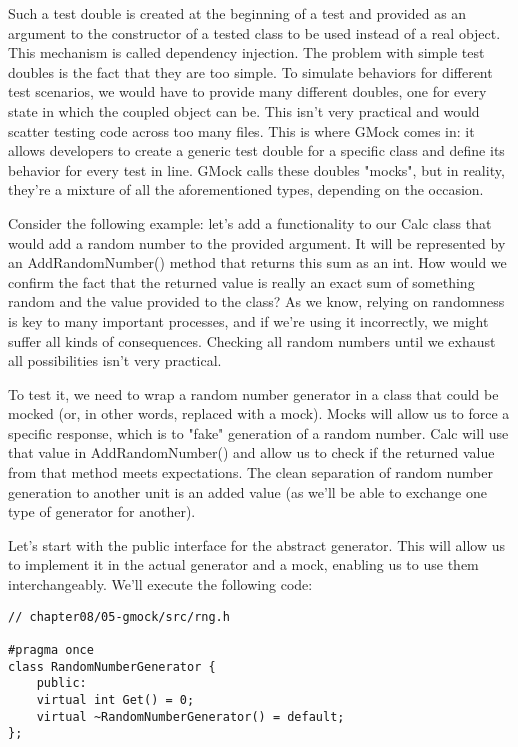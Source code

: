 Such a test double is created at the beginning of a test and provided as an argument to the constructor of a tested class to be used instead of a real object. This mechanism is called dependency injection. The problem with simple test doubles is the fact that they are too simple. To simulate behaviors for different test scenarios, we would have to provide many different doubles, one for every state in which the coupled object can be. This isn't very practical and would scatter testing code across too many files. This is where GMock comes in: it allows developers to create a generic test double for a specific class and define its behavior for every test in line. GMock calls these doubles "mocks", but in reality, they're a mixture of all the aforementioned types, depending on the occasion.

Consider the following example: let's add a functionality to our Calc class that would add a random number to the provided argument. It will be represented by an AddRandomNumber() method that returns this sum as an int. How would we confirm the fact that the returned value is really an exact sum of something random and the value provided to the class? As we know, relying on randomness is key to many important processes, and if we're using it incorrectly, we might suffer all kinds of consequences. Checking all random numbers until we exhaust all possibilities isn't very practical.

To test it, we need to wrap a random number generator in a class that could be mocked (or, in other words, replaced with a mock). Mocks will allow us to force a specific response, which is to "fake" generation of a random number. Calc will use that value in AddRandomNumber() and allow us to check if the returned value from that method meets expectations. The clean separation of random number generation to another unit is an added value (as we'll be able to exchange one type of generator for another).

Let's start with the public interface for the abstract generator. This will allow us to implement it in the actual generator and a mock, enabling us to use them interchangeably. We'll execute the following code:

\begin{lstlisting}[style=styleCXX]
// chapter08/05-gmock/src/rng.h

#pragma once
class RandomNumberGenerator {
	public:
	virtual int Get() = 0;
	virtual ~RandomNumberGenerator() = default;
};
\end{lstlisting}

